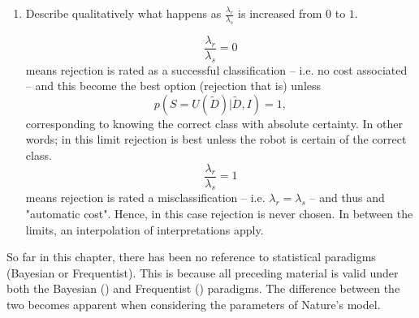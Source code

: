 \begin{example}
\begin{enumerate}
		\item Describe qualitatively what happens as $\frac{\lambda_r}{\lambda_s}$ is increased from $0$ to $1$.\newline
		
		\begin{equation}
			\frac{\lambda_r}{\lambda_s}=0
		\end{equation}
		means rejection is rated as a successful classification -- i.e. no cost associated -- and this become the best option (rejection that is) unless
		\begin{equation}
			p(S=U(\tilde{D})|\tilde{D},I)=1,
		\end{equation}
		corresponding to knowing the correct class with absolute certainty. In other words; in this limit rejection is best unless the robot is certain of the correct class. 
		\begin{equation}
			\frac{\lambda_r}{\lambda_s}=1
		\end{equation} 
		means rejection is rated a misclassification -- i.e. $\lambda_r=\lambda_s$ -- and thus and "automatic cost". Hence, in this case rejection is never chosen. In between the limits, an interpolation of interpretations apply.
	\end{enumerate}
\end{example}

\begin{remark}
	So far in this chapter, there has been no reference to statistical paradigms (Bayesian or Frequentist). This is because all preceding material is valid under both the Bayesian () and Frequentist () paradigms. The difference between the two becomes apparent when considering the parameters of Nature's model.
\end{remark}
